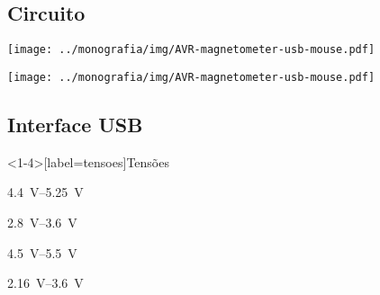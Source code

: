\documentclass{beamer}
\newcommand*{\VBUS}{V\textsubscript{BUS}\xspace}
\begin{document}
\subsection{Circuito}

\begin{frame}[plain, label=circuito-portrait]
	\begin{center}
		\texttt{[image: ../monografia/img/AVR-magnetometer-usb-mouse.pdf]}
	\end{center}
\end{frame}

\begin{frame}[plain, label=circuito-landscape]
	\begin{center}
		\texttt{[image: ../monografia/img/AVR-magnetometer-usb-mouse.pdf]}
	\end{center}
\end{frame}


\subsection{Interface USB}

\begin{frame}<1-4>[label=tensoes]{Tensões}
	\pause
	\begin{description}[<+->][HMC5883L]
		\item[USB \VBUS] \SIrange{4.4}{5.25}{\volt}
		\item[USB data]  \SIrange{2.8}{3.6}{\volt}
		\item[ATmega8]   \SIrange{4.5}{5.5}{\volt}
		\item[HMC5883L]  \SIrange{2.16}{3.6}{\volt}
	\end{description}
\end{frame}
\end{document}
